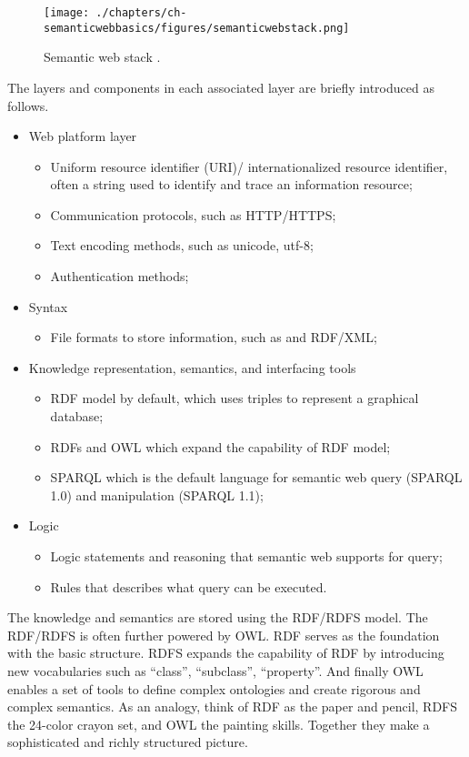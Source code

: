 \begin{figure}[htbp]
	\centering
	\texttt{[image: ./chapters/ch-semanticwebbasics/figures/semanticwebstack.png]}
	\caption{Semantic web stack \cite{semanticwebstack}.}
	\label{fig:semanticwebstack}
\end{figure}

The layers and components in each associated layer are briefly introduced as follows.
\begin{itemize}
	\item Web platform layer
	\begin{itemize}
		\item Uniform resource identifier (URI)/ internationalized resource identifier, often a string used to identify and trace an information resource;
		\item Communication protocols, such as HTTP/HTTPS;
		\item Text encoding methods, such as unicode, utf-8;
		\item Authentication methods;
	\end{itemize}
	\item Syntax
	\begin{itemize}
		\item File formats to store information, such as and RDF/XML;
	\end{itemize}
	\item Knowledge representation, semantics, and interfacing tools
	\begin{itemize}
		\item RDF model by default, which uses triples to represent a graphical database;
		\item RDFs and OWL which expand the capability of RDF model;
		\item SPARQL which is the default language for semantic web query (SPARQL 1.0) and manipulation (SPARQL 1.1);
	\end{itemize}
	\item Logic
	\begin{itemize}
		\item Logic statements and reasoning that semantic web supports for query;
		\item Rules that describes what query can be executed.
	\end{itemize}
\end{itemize}

The knowledge and semantics are stored using the RDF/RDFS model. The RDF/RDFS is often further powered by OWL. RDF serves as the foundation with the basic structure. RDFS expands the capability of RDF by introducing new vocabularies such as ``class'', ``subclass'', ``property''. And finally OWL enables a set of tools to define complex ontologies and create rigorous and complex semantics. As an analogy, think of RDF as the paper and pencil, RDFS the 24-color crayon set, and OWL the painting skills. Together they make a sophisticated and richly structured picture.

